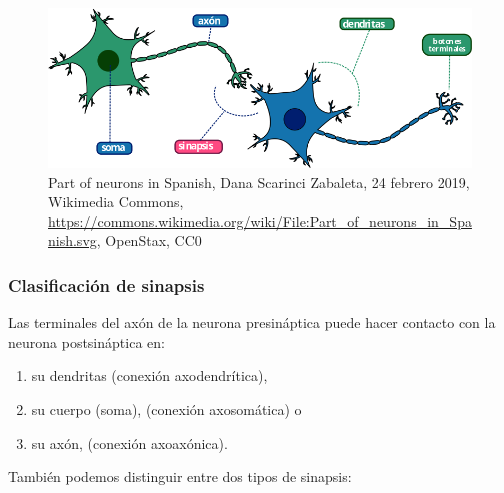 \begin{figure}[h]
 \centering
 \includegraphics[scale=0.5]{../Figuras/Part_of_neurons_in_Spanish.png}
 \caption{Part of neurons in Spanish, Dana Scarinci Zabaleta, 24 febrero 2019, Wikimedia Commons, \url{https://commons.wikimedia.org/wiki/File:Part_of_neurons_in_Spanish.svg}, OpenStax, CC0}
 \label{fig:sinapsisN}
\end{figure}


\subsubsection{Clasificación de sinapsis}

Las terminales del axón de la neurona presináptica puede hacer contacto con la neurona postsináptica en:
\begin{enumerate}
 \item su dendritas (conexión axodendrítica),
 \item su cuerpo (soma), (conexión axosomática) o
 \item su axón, (conexión axoaxónica).
\end{enumerate}


También podemos distinguir entre dos tipos de sinapsis:

